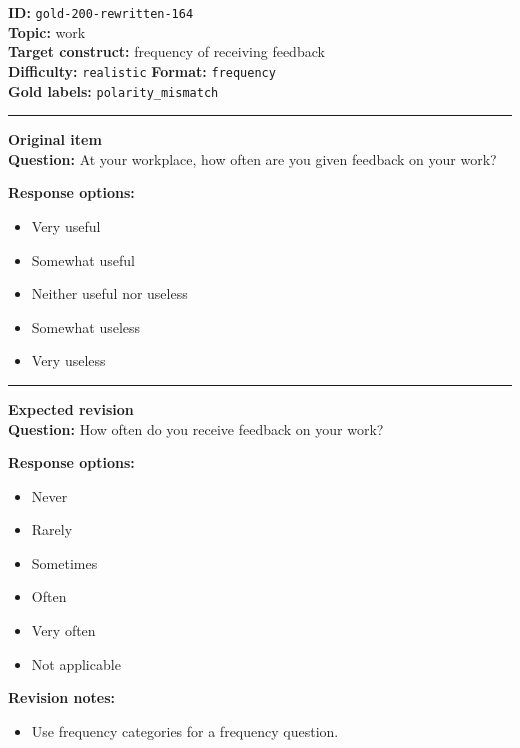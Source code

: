 \documentclass[10pt,a4paper]{article}
\newcommand{\sectionline}{\vspace{0.15em}\hrule\vspace{0.35em}}
\begin{document}
\begin{tcolorbox}[colframe=FlawRed,colback=white,colbacktitle=FlawRed!9,coltitle=black,title={Item 164\hfill Flawed item}]
\textbf{ID:} \texttt{gold-200-rewritten-164}\\
\textbf{Topic:} work\\
\textbf{Target construct:} frequency of receiving feedback\\
\textbf{Difficulty:} \texttt{realistic} \quad \textbf{Format:} \texttt{frequency}\\
\textbf{Gold labels:} \texttt{polarity\_mismatch}\\
\sectionline
\textbf{Original item}\\
\textbf{Question:} At your workplace, how often are you given feedback on your work?
\par\textbf{Response options:}
\begin{itemize}
\item Very useful
\item Somewhat useful
\item Neither useful nor useless
\item Somewhat useless
\item Very useless
\end{itemize}
\sectionline
\textbf{Expected revision}\\
\textbf{Question:} How often do you receive feedback on your work?
\par\textbf{Response options:}
\begin{itemize}
\item Never
\item Rarely
\item Sometimes
\item Often
\item Very often
\item Not applicable
\end{itemize}
\par\textbf{Revision notes:}
\begin{itemize}
\item Use frequency categories for a frequency question.
\end{itemize}
\end{tcolorbox}
\end{document}
